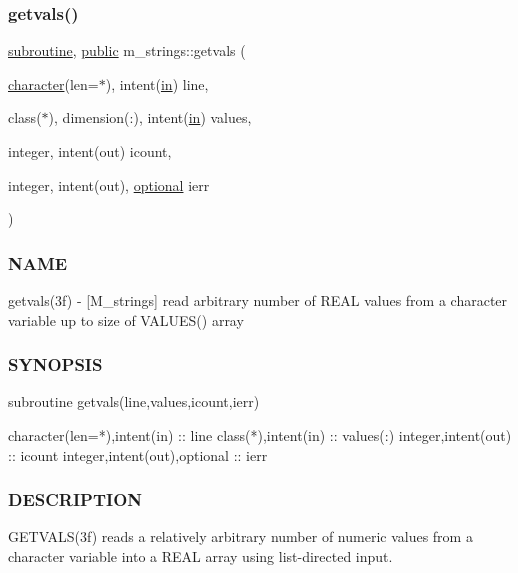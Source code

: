 \subsubsection{\texorpdfstring{getvals()}{getvals()}}
{\footnotesize\ttfamily \hyperlink{M__stopwatch_83_8txt_acfbcff50169d691ff02d4a123ed70482}{subroutine}, \hyperlink{M__stopwatch_83_8txt_a2f74811300c361e53b430611a7d1769f}{public} m\+\_\+strings\+::getvals (\begin{DoxyParamCaption}\item[{\hyperlink{option__stopwatch_83_8txt_abd4b21fbbd175834027b5224bfe97e66}{character}(len=$\ast$), intent(\hyperlink{M__journal_83_8txt_afce72651d1eed785a2132bee863b2f38}{in})}]{line,  }\item[{class($\ast$), dimension(\+:), intent(\hyperlink{M__journal_83_8txt_afce72651d1eed785a2132bee863b2f38}{in})}]{values,  }\item[{integer, intent(out)}]{icount,  }\item[{integer, intent(out), \hyperlink{option__stopwatch_83_8txt_aa4ece75e7acf58a4843f70fe18c3ade5}{optional}}]{ierr }\end{DoxyParamCaption})}



\subsubsection*{N\+A\+ME}

getvals(3f) -\/ \mbox{[}M\+\_\+strings\mbox{]} read arbitrary number of R\+E\+AL values from a character variable up to size of V\+A\+L\+U\+E\+S() array 

\subsubsection*{S\+Y\+N\+O\+P\+S\+IS}

\begin{DoxyVerb}subroutine getvals(line,values,icount,ierr)

 character(len=*),intent(in)  :: line
 class(*),intent(in)          :: values(:)
 integer,intent(out)          :: icount
 integer,intent(out),optional :: ierr
\end{DoxyVerb}


\subsubsection*{D\+E\+S\+C\+R\+I\+P\+T\+I\+ON}

G\+E\+T\+V\+A\+L\+S(3f) reads a relatively arbitrary number of numeric values from a character variable into a R\+E\+AL array using list-\/directed input.

